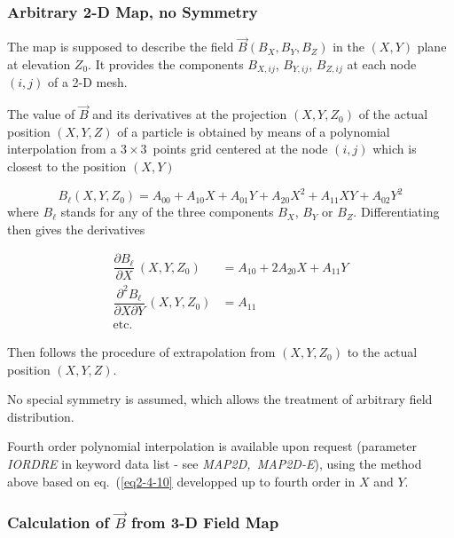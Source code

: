 \subsubsection{Arbitrary 2-D Map, no Symmetry} \label{sec2.4.3}

The map is supposed to describe the field $ \vec  B(B_X,B_Y,B_Z) $
in the $ (X,Y) $ 
plane at elevation $ Z_0 $. It provides the components $ B_{X,ij}$, $
B_{Y,ij}$,  $ B_{Z,ij} $ at 
each node $ (i,j) $ of a 2-D mesh. 

\noindent The value of $ \vec  B $ and its derivatives at the projection $
(X,Y,Z_0) $ of the actual position $ (X,Y,Z) $ 
of a particle is obtained by means of a polynomial interpolation from a  
$3 \times 3$~points grid centered at the node $(i,j) $
which is closest to the position $ (X,Y)$

 \begin{equation}
	 B_{\ell} (X,Y,Z_0)=A_{00} +A_{10} X +A_{01} Y +A_{20} X^2 +A_{11} X Y +A_{02} Y^2
 	\label{eq2-4-10}
 \end{equation}
where $ B_{\ell} $ stands for any of the three components $ B_X$, 
$B_Y $ or $ B_Z $. 
Differentiating then gives the derivatives

\begin{equation}
	\begin{aligned}
		 \dfrac{ \partial B_{\ell} }{ \partial X} \,(X,Y,Z_0)
		     & =   A_{10} +2 A_{20} X + A_{11} Y  \\
		\dfrac{ \partial^2 B_{\ell} }{ \partial X\partial Y}\, (X,Y,Z_0)
		     & =  A_{11} \\
		\text{etc.}
	\end{aligned}
	\label{eq2-4-11}
\end{equation}


\noindent Then follows the procedure of extrapolation from $ (X,Y,Z_0) $ to
the actual position $ (X,Y,Z)$. 

\noindent No special symmetry is assumed, which allows the treatment of 
arbitrary field distribution. 

\noindent Fourth order polynomial interpolation is available upon request (parameter 
\textsl{IORDRE} in  keyword data list - see \textsl{MAP2D,~MAP2D-E}), using 
the method above based on eq.~(\ref{eq2-4-10} developped up to fourth order in $X$ and $Y$. 


\subsubsection{Calculation of $\vec B $ from  3-D Field Map} \label{sec2.4.4}

